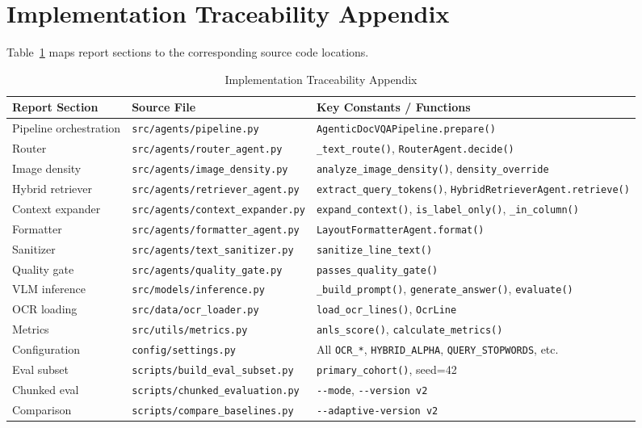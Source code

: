 \documentclass[11pt,a4paper]{article}
\begin{document}
\newpage
\section{Implementation Traceability Appendix}
Table~\ref{tab:traceability} maps report sections to the corresponding source code locations.

\begin{table}[H]
\centering
\caption{Implementation Traceability Appendix}
\label{tab:traceability}
\begin{small}
\begin{tabular}{|p{4.5cm}|p{4.5cm}|p{6cm}|}
\hline
\textbf{Report Section} & \textbf{Source File} & \textbf{Key Constants / Functions} \\ \hline
Pipeline orchestration & \texttt{src/agents/pipeline.py} & \texttt{AgenticDocVQAPipeline.prepare()} \\ \hline
Router & \texttt{src/agents/router\_agent.py} & \texttt{\_text\_route()}, \texttt{RouterAgent.decide()} \\ \hline
Image density & \texttt{src/agents/image\_density.py} & \texttt{analyze\_image\_density()}, \texttt{density\_override} \\ \hline
Hybrid retriever & \texttt{src/agents/retriever\_agent.py} & \texttt{extract\_query\_tokens()}, \texttt{HybridRetrieverAgent.retrieve()} \\ \hline
Context expander & \texttt{src/agents/context\_expander.py} & \texttt{expand\_context()}, \texttt{is\_label\_only()}, \texttt{\_in\_column()} \\ \hline
Formatter & \texttt{src/agents/formatter\_agent.py} & \texttt{LayoutFormatterAgent.format()} \\ \hline
Sanitizer & \texttt{src/agents/text\_sanitizer.py} & \texttt{sanitize\_line\_text()} \\ \hline
Quality gate & \texttt{src/agents/quality\_gate.py} & \texttt{passes\_quality\_gate()} \\ \hline
VLM inference & \texttt{src/models/inference.py} & \texttt{\_build\_prompt()}, \texttt{generate\_answer()}, \texttt{evaluate()} \\ \hline
OCR loading & \texttt{src/data/ocr\_loader.py} & \texttt{load\_ocr\_lines()}, \texttt{OcrLine} \\ \hline
Metrics & \texttt{src/utils/metrics.py} & \texttt{anls\_score()}, \texttt{calculate\_metrics()} \\ \hline
Configuration & \texttt{config/settings.py} & All \texttt{OCR\_*}, \texttt{HYBRID\_ALPHA}, \texttt{QUERY\_STOPWORDS}, etc. \\ \hline
Eval subset & \texttt{scripts/build\_eval\_subset.py} & \texttt{primary\_cohort()}, seed=42 \\ \hline
Chunked eval & \texttt{scripts/chunked\_evaluation.py} & \texttt{-{}-mode}, \texttt{-{}-version v2} \\ \hline
Comparison & \texttt{scripts/compare\_baselines.py} & \texttt{-{}-adaptive-version v2} \\ \hline
\end{tabular}
\end{small}
\end{table}
\end{document}
